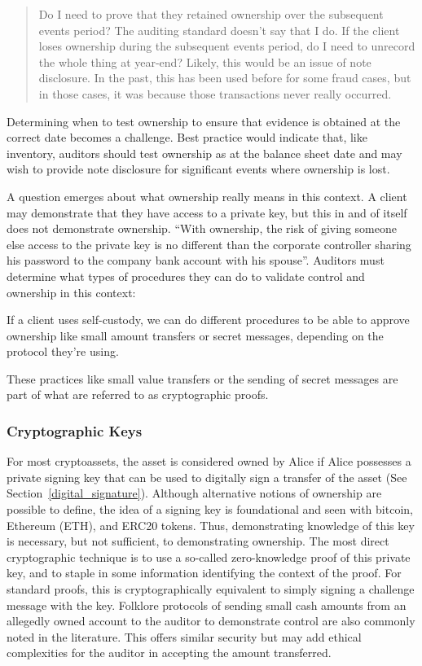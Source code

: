 \begin{quote}
Do I need to prove that they retained ownership over the subsequent events period? The auditing standard doesn't say that I do. If the client loses ownership during the subsequent events period, do I need to unrecord the whole thing at year-end? Likely, this would be an issue of note disclosure. In the past, this has been used before for some fraud cases, but in those cases, it was because those transactions never really occurred.
\end{quote}

Determining when to test ownership to ensure that evidence is obtained at the correct date becomes a challenge. Best practice would indicate that, like inventory, auditors should test ownership as at the balance sheet date and may wish to provide note disclosure for significant events where ownership is lost. 

A question emerges about what ownership really means in this context. A client may demonstrate that they have access to a private key, but this in and of itself does not demonstrate ownership. ``With ownership, the risk of giving someone else access to the private key is no different than the corporate controller sharing his password to the company bank account with his spouse''. Auditors must determine what types of procedures they can do to validate control and ownership in this context: 

If a client uses self-custody, we can do different procedures to be able to approve ownership like small amount transfers or secret messages, depending on the protocol they're using. 

These practices like small value transfers or the sending of secret messages are part of what are referred to as cryptographic proofs. 

\subsubsection{Cryptographic Keys} 

For most cryptoassets, the asset is considered owned by Alice if Alice possesses a private signing key that can be used to digitally sign a transfer of the asset (See Section~\ref{digital_signature}). Although alternative notions of ownership are possible to define, the idea of a signing key is foundational and seen with bitcoin, Ethereum (ETH), and ERC20 tokens. Thus, demonstrating knowledge of this key is necessary, but not sufficient, to demonstrating ownership. The most direct cryptographic technique is to use a so-called zero-knowledge proof of this private key, and to staple in some information identifying the context of the proof. For standard proofs, this is cryptographically equivalent to simply signing a challenge message with the key. Folklore protocols of sending small cash amounts from an allegedly owned account to the auditor to demonstrate control are also commonly noted in the literature. This offers similar security but may add ethical complexities for the auditor in accepting the amount transferred. 

